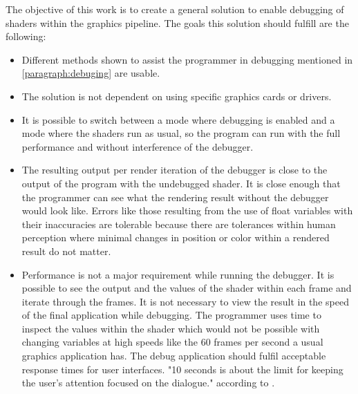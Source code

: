 The objective of this work is to create a general solution to enable debugging of shaders within the graphics pipeline. The goals this solution should fulfill are the following:

\begin{itemize}
	\item Different methods shown to assist the programmer in debugging mentioned in \autoref{paragraph:debuging} are usable.
	\item The solution is not dependent on using specific graphics cards or drivers.
	\item It is possible to switch between a mode where debugging is enabled and a mode where the shaders run as usual, so the program can run with the full performance and without interference of the debugger.
	\item The resulting output per render iteration of the debugger is close to the output of the program with the undebugged shader. It is close enough that the programmer can see what the rendering result without the debugger would look like. Errors like those resulting from the use of float variables with their inaccuracies are tolerable because there are tolerances within human perception where minimal changes in position or color within a rendered result do not matter.
	\item Performance is not a major requirement while running the debugger. It is possible to see the output and the values of the shader within each frame and iterate through the frames. It is not necessary to view the result in the speed of the final application while debugging. The programmer uses time to inspect the values within the shader which would not be possible with changing variables at high speeds like the 60 frames per second a usual graphics application has. The debug application should fulfil acceptable response times for user interfaces. "10 seconds is about the limit for keeping the user's attention focused on the dialogue." according to .
\end{itemize}




